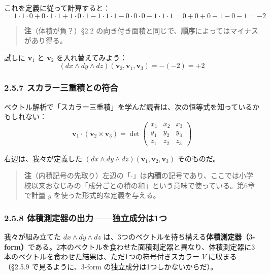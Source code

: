 \documentclass[a4paper,12pt,openany]{book}
\begin{document}
これを定義に従って計算すると：
\[= 1\cdot1\cdot0 + 0\cdot1\cdot1 + 1\cdot0\cdot1 - 1\cdot1\cdot1 - 0\cdot0\cdot0 - 1\cdot1\cdot1 = 0 + 0 + 0 - 1 - 0 - 1 = -2\]

\begin{quote}
\textbf{注}（体積が負？）§2.2
の向き付き面積と同じで、\textbf{順序}によってはマイナスがあり得る。
\end{quote}

試しに \(\mathbf{v}_1\) と \(\mathbf{v}_2\) を入れ替えてみよう：
\[(dx \wedge dy \wedge dz)(\mathbf{v}_2, \mathbf{v}_1, \mathbf{v}_3) = -(-2) = +2\]

\hypertarget{ux30b9ux30abux30e9ux30fcux4e09ux91cdux7a4dux3068ux306eux7b26ux5408}{%
\subsubsection{2.5.7
スカラー三重積との符合}\label{ux30b9ux30abux30e9ux30fcux4e09ux91cdux7a4dux3068ux306eux7b26ux5408}}

ベクトル解析で「スカラー三重積」を学んだ読者は、次の恒等式を知っているかもしれない：
\[\mathbf{v}_1 \cdot (\mathbf{v}_2 \times \mathbf{v}_3) = \det\begin{pmatrix}x_1 & x_2 & x_3 \\ y_1 & y_2 & y_3 \\ z_1 & z_2 & z_3\end{pmatrix}\]

右辺は、我々が定義した
\((dx \wedge dy \wedge dz)(\mathbf{v}_1, \mathbf{v}_2, \mathbf{v}_3)\)
そのものだ。

\begin{quote}
\textbf{注}（内積記号の先取り）左辺の「\(\cdot\)」は\textbf{内積}の記号であり、ここでは小学校以来おなじみの「成分ごとの積の和」という意味で使っている。第6章で計量
\(g\) を使った形式的な定義を与える。
\end{quote}

\hypertarget{ux4f53ux7a4dux6e2cux5b9aux5668ux306eux51faux529bux72ecux7acbux6210ux5206ux306f1ux3064}{%
\subsubsection{2.5.8
体積測定器の出力——独立成分は1つ}\label{ux4f53ux7a4dux6e2cux5b9aux5668ux306eux51faux529bux72ecux7acbux6210ux5206ux306f1ux3064}}

我々が組み立てた \(dx \wedge dy \wedge dz\)
は、3つのベクトルを待ち構える\textbf{体積測定器（}\(3\)\textbf{-form）}である。2本のベクトルを食わせた面積測定器と異なり、体積測定器に3本のベクトルを食わせた結果は、ただ1つの符号付きスカラー
\(V\) に収まる（§2.5.9 で見るように、\(3\)-form
の独立成分は1つしかないからだ）。
\end{document}
